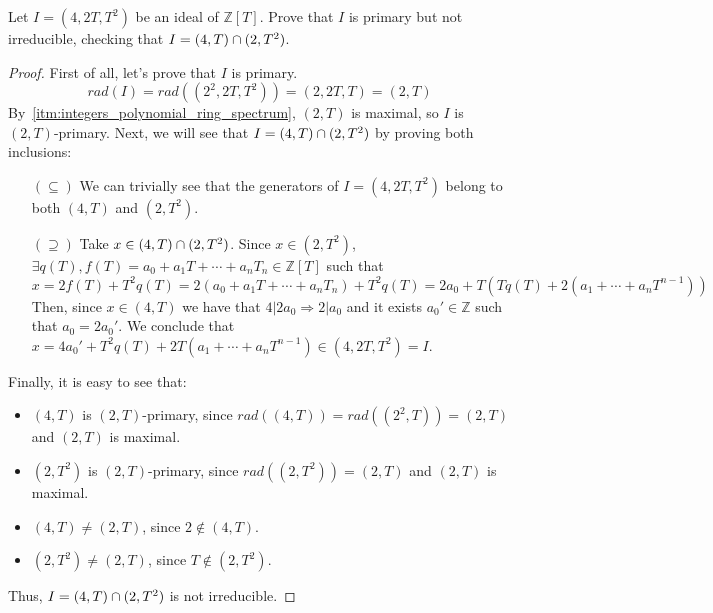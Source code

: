 \begin{problem}\label{itm:primary_not_irreducible_example}
    Let $I = (4, 2T, T^2)$ be an ideal of $\mathbb{Z}[T]$.
    Prove that $I$ is primary but not irreducible, checking that $I = (4,T) \cap (2,T^2)$.
    \begin{sol}
        \begin{proof}
            First of all, let's prove that $I$ is primary.
            \[ rad(I) = rad((2^2, 2T, T^2)) = (2, 2T, T) = (2, T) \]
            By~\ref{itm:integers_polynomial_ring_spectrum}, $(2,T)$ is maximal, so $I$ is $(2,T)$-primary.
            Next, we will see that $I = (4,T) \cap (2,T^2)$ by proving both inclusions:
            \begin{itemize}
                \item[$(\subseteq)$]
                We can trivially see that the generators of $I = (4, 2T, T^2)$ belong to both $(4,T)$ and $(2,T^2)$.
                \item[$(\supseteq)$]
                Take $x \in (4,T) \cap (2,T^2)$.
                Since $x \in (2,T^2)$, $\exists q(T), f(T) = a_0 + a_1 T + \cdots + a_n T_n \in \mathbb{Z}[T]$ such that
                \[ x = 2 f(T) + T^2 q(T) = 2 (a_0 + a_1 T + \cdots + a_n T_n) + T^2 q(T) = 2 a_0 + T(T q(T) + 2 (a_1 + \cdots + a_n T^{n-1})) \]
                Then, since $x \in (4,T)$ we have that $4 | 2 a_0 \Rightarrow 2 | a_0$ and it exists $a_0' \in \mathbb{Z}$ such that $a_0 = 2 a_0'$.
                We conclude that $x = 4 a_0' + T^2 q(T) + 2T (a_1 + \cdots + a_n T^{n-1}) \in (4, 2T, T^2) = I$.
            \end{itemize}
            Finally, it is easy to see that:
            \begin{itemize}
                \item $(4,T)$ is $(2,T)$-primary, since $rad((4,T)) = rad((2^2,T)) = (2,T)$ and $(2,T)$ is maximal.
                \item $(2,T^2)$ is $(2,T)$-primary, since $rad((2,T^2)) = (2,T)$ and $(2,T)$ is maximal.
                \item $(4,T) \neq (2,T)$, since $2 \notin (4,T)$.
                \item $(2,T^2) \neq (2,T)$, since $T \notin (2,T^2)$.
            \end{itemize}
            Thus, $I = (4,T) \cap (2,T^2)$ is not irreducible.
        \end{proof}
    \end{sol}
\end{problem}